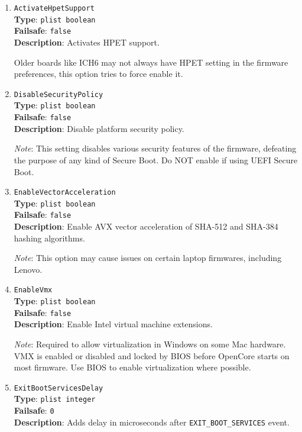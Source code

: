 \documentclass[]{article}
\begin{document}
\begin{enumerate}

\item
  \texttt{ActivateHpetSupport}\\
  \textbf{Type}: \texttt{plist\ boolean}\\
  \textbf{Failsafe}: \texttt{false}\\
  \textbf{Description}: Activates HPET support.

  Older boards like ICH6 may not always have HPET setting in the firmware preferences,
  this option tries to force enable it.

\item
  \texttt{DisableSecurityPolicy}\\
  \textbf{Type}: \texttt{plist\ boolean}\\
  \textbf{Failsafe}: \texttt{false}\\
  \textbf{Description}: Disable platform security policy.

  \emph{Note}: This setting disables various security features of the firmware,
  defeating the purpose of any kind of Secure Boot. Do NOT enable if using
  UEFI Secure Boot.

\item
  \texttt{EnableVectorAcceleration}\\
  \textbf{Type}: \texttt{plist\ boolean}\\
  \textbf{Failsafe}: \texttt{false}\\
  \textbf{Description}: Enable AVX vector acceleration of SHA-512 and SHA-384 hashing algorithms.

  \emph{Note}: This option may cause issues on certain laptop firmwares, including Lenovo.

\item
  \texttt{EnableVmx}\\
  \textbf{Type}: \texttt{plist\ boolean}\\
  \textbf{Failsafe}: \texttt{false}\\
  \textbf{Description}: Enable Intel virtual machine extensions.

  \emph{Note}: Required to allow virtualization in Windows on some Mac hardware. VMX
  is enabled or disabled and locked by BIOS before OpenCore starts on most
  firmware. Use BIOS to enable virtualization where possible.

\item
  \texttt{ExitBootServicesDelay}\\
  \textbf{Type}: \texttt{plist\ integer}\\
  \textbf{Failsafe}: \texttt{0}\\
  \textbf{Description}: Adds delay in microseconds after \texttt{EXIT\_BOOT\_SERVICES}
  event.


\end{enumerate}
\end{document}

